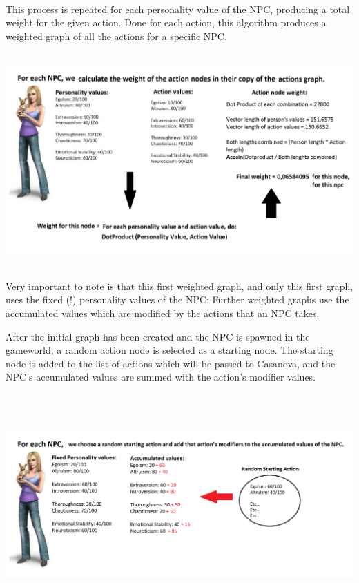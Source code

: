 \documentclass[11pt]{article} %
\begin{document}
~\\
This process is repeated for each personality value of the NPC, producing a total weight for the given action. Done for each action, this algorithm produces a weighted graph of all the actions for a specific NPC.


~\\
\includegraphics[scale=0.4]{FillingAlgorithm}


~\\
Very important to note is that this first weighted graph, and only this first graph, uses the fixed (!) personality values of the NPC: Further weighted graphs use the accumulated values which are modified by the actions that an NPC takes.



\newpage
After the initial graph has been created and the NPC is spawned in the gameworld, a random action node is selected as a starting node. The starting node is added to the list of actions which will be passed to Casanova, and the NPC's accumulated values are summed with the action's modifier values. 

~\\
\includegraphics[width=17cm, height=7.5cm]{DecisionMakingAlgorithm}
\end{document}

